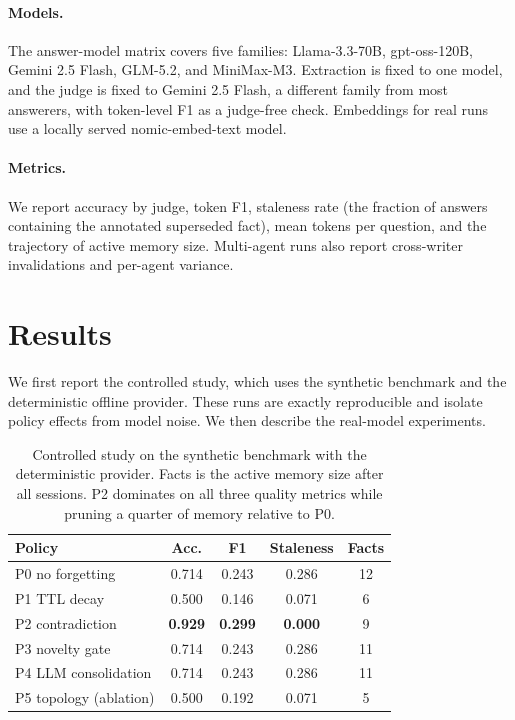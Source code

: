 \documentclass[letterpaper]{article} %
\begin{document}
\paragraph{Models.} The answer-model matrix covers five families: Llama-3.3-70B, gpt-oss-120B, Gemini 2.5 Flash, GLM-5.2, and MiniMax-M3. Extraction is fixed to one model, and the judge is fixed to Gemini 2.5 Flash, a different family from most answerers, with token-level F1 as a judge-free check. Embeddings for real runs use a locally served nomic-embed-text model.

\paragraph{Metrics.} We report accuracy by judge, token F1, staleness rate (the fraction of answers containing the annotated superseded fact), mean tokens per question, and the trajectory of active memory size. Multi-agent runs also report cross-writer invalidations and per-agent variance.

\section{Results}

We first report the controlled study, which uses the synthetic benchmark and the deterministic offline provider. These runs are exactly reproducible and isolate policy effects from model noise. We then describe the real-model experiments.


\begin{table}[t]
\centering
\small
\begin{tabular}{@{}lcccc@{}}
\toprule
Policy & Acc. & F1 & Staleness & Facts \\
\midrule
P0 no forgetting & 0.714 & 0.243 & 0.286 & 12 \\
P1 TTL decay & 0.500 & 0.146 & 0.071 & 6 \\
P2 contradiction & \textbf{0.929} & \textbf{0.299} & \textbf{0.000} & 9 \\
P3 novelty gate & 0.714 & 0.243 & 0.286 & 11 \\
P4 LLM consolidation & 0.714 & 0.243 & 0.286 & 11 \\
P5 topology (ablation) & 0.500 & 0.192 & 0.071 & 5 \\
\bottomrule
\end{tabular}
\caption{Controlled study on the synthetic benchmark with the deterministic provider. Facts is the active memory size after all sessions. P2 dominates on all three quality metrics while pruning a quarter of memory relative to P0.}
\label{tab:controlled}
\end{table}
\end{document}
